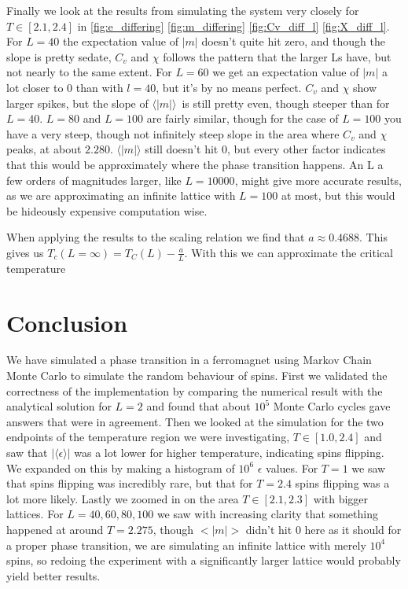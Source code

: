 \documentclass[english,notitlepage,reprint,nofootinbib]{revtex4-1}  %
\begin{document}
Finally we look at the results from simulating the system very closely for $T \in[2.1,2.4]$ in \ref{fig:e_differing} \ref{fig:m_differing} \ref{fig:Cv_diff_l} \ref{fig:X_diff_l}. For $L=40$ the expectation value of $|m|$ doesn't quite hit zero, and though the slope is pretty sedate, $C_v$ and $\chi$ follows the pattern that the larger Ls have, but not nearly to the same extent. For $L=60$ we get an expectation value of $|m|$ a lot closer to $0$ than with $l=40$, but it's by no means perfect. $C_v$ and $\chi$ show larger spikes, but the slope of $\langle|m|\rangle$ is still pretty even, though steeper than for $L=40$. $L=80$ and $L=100$ are fairly similar, though for the case of $L=100$ you have a very steep, though not infinitely steep slope in the area where $C_v$ and $\chi$ peaks, at about $2.280$. $\langle|m|\rangle$ still doesn't hit 0, but every other factor indicates that this would be approximately where the phase transition happens\cite{compy_phys_lecture_notes}. An L a few orders of magnitudes larger, like $L=10000$, might give more accurate results, as we are approximating an infinite lattice with $L=100$ at most, but this would be hideously expensive computation wise.

When applying the results to the scaling relation we find that $a\approx 0.4688$. This gives us $T_c(L=\infty) = T_C(L) - \frac{a}{L}$. With this we can approximate the critical temperature


 
\section{Conclusion}\label{sec:conclusion}
We have simulated a phase transition in a ferromagnet using Markov Chain Monte Carlo to simulate the random behaviour of spins. First we validated the correctness of the implementation by comparing the numerical result with the analytical solution for $L=2$ and found that about $10^5$ Monte Carlo cycles gave answers that were in agreement. Then we looked at the simulation for the two endpoints of the temperature region we were investigating, $T\in [1.0, 2.4]$ and saw that $|\langle\epsilon\rangle|$ was a lot lower for higher temperature, indicating spins flipping. We expanded on this by making a histogram of $10^6$ $\epsilon$ values. For $T=1$ we saw that spins flipping was incredibly rare, but that for $T=2.4$ spins flipping was a lot more likely. Lastly we zoomed in on the area $T \in[2.1,2.3]$ with bigger lattices. For $L=40,60,80,100$ we saw with increasing clarity that something happened at around $T=2.275$, though $<|m|>$ didn't hit $0$ here as it should for a proper phase transition, we are simulating an infinite lattice with merely $10^4$ spins, so redoing the experiment with a significantly larger lattice would probably yield better results.
\onecolumngrid
\end{document}
